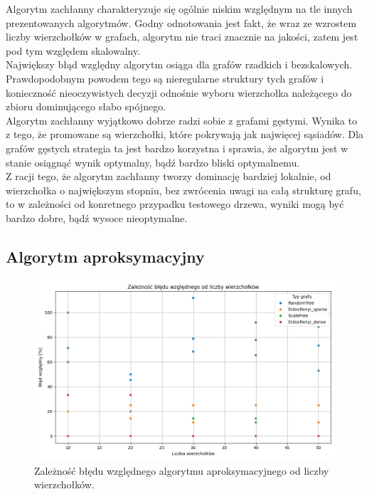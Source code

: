 Algorytm zachłanny charakteryzuje się ogólnie niskim względnym na tle innych prezentowanych algorytmów. Godny odnotowania jest fakt, że wraz ze wzrostem liczby wierzchołków w grafach, algorytm nie traci znacznie na jakości, zatem jest pod tym względem skalowalny.\\
Największy błąd względny algorytm osiąga dla grafów rzadkich i bezskalowych. Prawdopodobnym powodem tego są nieregularne struktury tych grafów i konieczność nieoczywistych decyzji odnośnie wyboru wierzchołka należącego do zbioru dominującego słabo spójnego.\\
Algorytm zachłanny wyjątkowo dobrze radzi sobie z grafami gęstymi. Wynika to z tego, że promowane są wierzchołki, które pokrywają jak najwięcej sąsiadów. Dla grafów gęstych strategia ta jest bardzo korzystna i sprawia, że algorytm jest w stanie osiągnąć wynik optymalny, bądź bardzo bliski optymalnemu.\\
Z racji tego, że algorytm zachłanny tworzy dominację bardziej lokalnie, od wierzchołka o największym stopniu, bez zwrócenia uwagi na całą strukturę grafu, to w zależności od konretnego przypadku testowego drzewa, wyniki mogą być bardzo dobre, bądź wysoce nieoptymalne. 

\subsection{Algorytm aproksymacyjny}

\begin{figure}[H]
    \centering
    \includegraphics[width=\textwidth]{assets/plots_approx/approx.png}
    \caption{Zależność błędu względnego algorytmu aproksymacyjnego od liczby wierzchołków.}
    \label{fig:approxPlot}
\end{figure}

